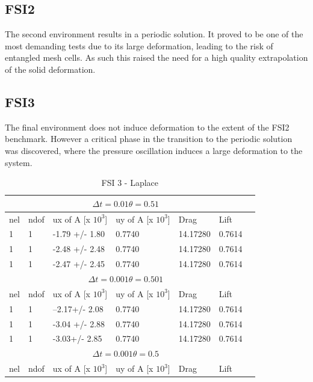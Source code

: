 \subsection{FSI2}
The second environment results in a periodic solution. It proved to be one of the most demanding tests due to its large deformation, leading to the risk of entangled mesh cells. As such this raised the need for a high quality extrapolation of the solid deformation.
\\
\subsection{FSI3}    
The final environment does not induce deformation to the extent of the FSI2 benchmark. However a critical phase in the transition to the periodic solution was discovered, where the pressure oscillation induces a large deformation to the system. 
\begin{table}[h!]
\centering
\caption{FSI 3 - Laplace}
\label{my-label}
\begin{tabular}{ |p{1cm}||p{1cm}|p{2.5cm}|p{2.3cm}|p{2.3cm}|p{1.2cm}|p{1.2cm}|}
 \hline
  \multicolumn{6}{|c|}{$\Delta t = 0.01 \theta = 0.51$} \\
   \hline
nel & ndof & ux of A [x $10^{3}$]  &uy of A [x $10^{3}$]& Drag  & Lift \\
 \hline
1 &1 & -1.79 +/-  1.80  &  0.7740  & 14.17280  &  0.7614 \\
1 &1 & -2.48 +/-  2.48 &  0.7740  & 14.17280  &  0.7614 \\
1 &1 & -2.47   +/-  2.45 &  0.7740  & 14.17280  &  0.7614 \\
 \hline
  \multicolumn{6}{|c|}{$\Delta t = 0.001 \theta = 0.501$} \\
   \hline
 nel & ndof & ux of A [x $10^{3}$]  &uy of A [x $10^{3}$]& Drag  & Lift \\
 1 &1 & --2.17+/-  2.08 &  0.7740  & 14.17280  &  0.7614 \\
  1 &1 & -3.04 +/-  2.88 &  0.7740  & 14.17280  &  0.7614 \\
   1 &1 & -3.03+/-  2.85 &  0.7740  & 14.17280  &  0.7614 \\
\hline
\multicolumn{6}{|c|}{$\Delta t = 0.001 \theta = 0.5$} \\
   \hline
 nel & ndof & ux of A [x $10^{3}$]  &uy of A [x $10^{3}$]& Drag  & Lift \\
\hline
\end{tabular}
\end{table}


